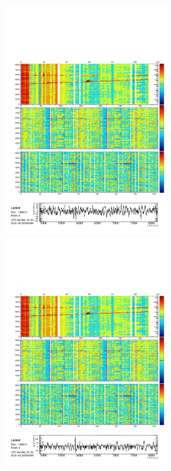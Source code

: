 \begin{figure}
\begin{subfigure}[t]{\linewidth}
\begin{minipage}{0.48\textwidth}
      \includegraphics[width=0.8\textwidth]{DataMuonV1.pdf}
      \includegraphics[width=0.8\textwidth]{DataMuonV2.pdf}

\end{minipage}
\end{subfigure}
\end{figure}

